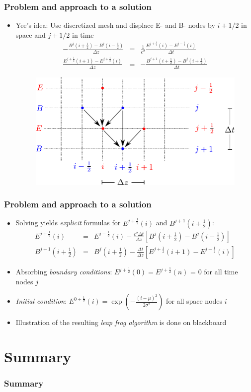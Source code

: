 \documentclass[ignorenonframetext]{beamer}
\begin{document}
\begin{frame}
\frametitle{Problem and approach to a solution}
\begin{itemize}
\item Yee's idea: Use discretized mesh and displace E- and B- nodes by $i + 1/2$ in space and $j + 1/2$ in time 
\begin{eqnarray}
- \frac{B^{j}(i+\frac{1}{2}) - B^{j}(i-\frac{1}{2})}{\Delta z} &=& \frac{1}{c^2} \frac{E^{j+\frac{1}{2}}(i) - E^{j-\frac{1}{2}}(i)}{\Delta t}\nonumber\\
\frac{E^{j+\frac{1}{2}}(i + 1) - E^{j+\frac{1}{2}}(i)}{\Delta z} &=& -\frac{B^{j+1}(i+\frac{1}{2}) - B^{j}(i+\frac{1}{2})}{\Delta t} 
\end{eqnarray}
\begin{figure}
\centering
\includegraphics[width=0.7\linewidth]{yee_mesh}
\caption{}
\label{fig:yee_mesh}
\end{figure}

\end{itemize}
\end{frame}

\begin{frame}
\frametitle{Problem and approach to a solution}
\begin{itemize}
\item Solving yields \emph{explicit} formulas for $E^{j+\frac{1}{2}}(i)$ and $B^{j+1}(i+\frac{1}{2})$:
\begin{eqnarray}
E^{j+\frac{1}{2}}(i)&=& E^{j-\frac{1}{2}}(i) -  \frac{c^2 \Delta t}{\Delta z} \left[B^j(i+\frac{1}{2}) - B^j(i-\frac{1}{2})\right] \nonumber\\
B^{j+1}(i+\frac{1}{2}) &=& B^{j}(i+\frac{1}{2}) - \frac{\Delta t}{\Delta z}\left[E^{j+\frac{1}{2}}(i+1) - E^{j+\frac{1}{2}}(i)\right]
\end{eqnarray}
\item Absorbing \emph{boundary conditions}: $E^{j+\frac{1}{2}}(0) = E^{j+\frac{1}{2}}(n)$ = 0 for all time nodes $j$
\item \emph{Initial condition}: $E^{0+\frac{1}{2}}(i) = \exp\left(-\frac{(i - \mu)^2}{2 \sigma^2}\right)$ for all space nodes $i$
\item Illustration of the resulting \emph{leap frog algorithm} is done on blackboard 
\end{itemize}
\end{frame}




\section{Summary}
\begin{frame}
\frametitle{Summary}
\end{frame}
\end{document}

